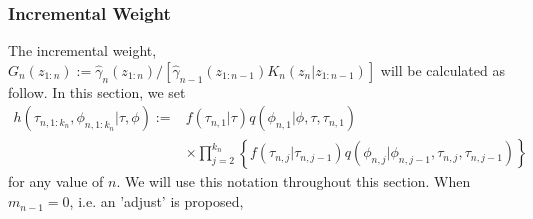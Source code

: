 \documentclass[12pt,a4paper]{article}
\begin{document}
\subsubsection{Incremental Weight}
The incremental weight, $G_n\left(z_{1:n}\right):= \hat{\gamma}_n\left(z_{1:n}\right) / \left[\hat{\gamma}_{n-1}\left(z_{1:n-1}\right)K_n\left(z_{n}|z_{1:n-1}\right)\right]$ will be calculated as follow. In this section, we set     
\begin{equation*}
        \begin{split}
            h\left(\tau_{n,1:k_n},\phi_{n,1:k_n}|\tau,\phi \right) := &f\left(\tau_{n,1}| \tau\right) q\left(\phi_{n,1}|\phi,\tau,\tau_{n,1}\right)\\
             & \times \prod_{j=2}^{k_n} \left\{f(\tau_{n,j}|\tau_{n,j-1})q(\phi_{n,j}|\phi_{n,j-1},\tau_{n,j},\tau_{n,j-1})\right\}
        \end{split}
\end{equation*}
for any value of $n$. We will use this notation throughout this section. 
When $m_{n-1} = 0$, i.e. an 'adjust' is proposed,
\end{document}
